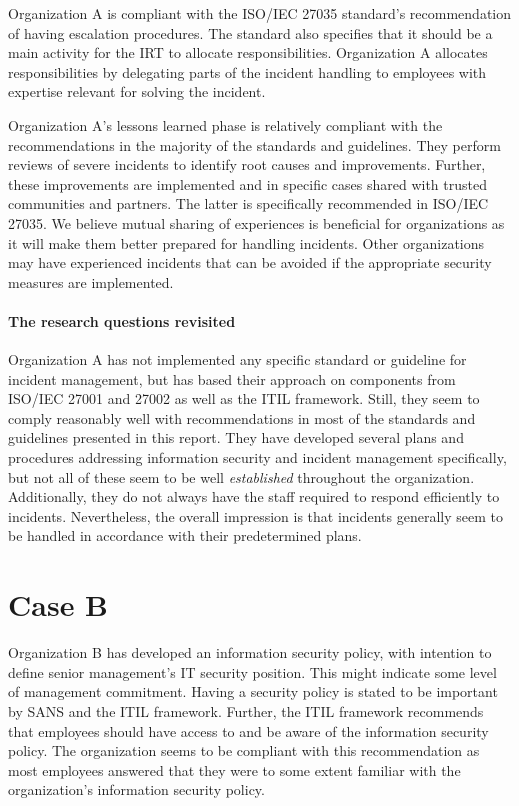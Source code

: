 Organization A is compliant with the ISO/IEC 27035 standard's recommendation of having escalation procedures. The standard also specifies that it should be a main activity for the \ac{IRT} to allocate responsibilities. Organization A allocates responsibilities by delegating parts of the incident handling to employees with expertise relevant for solving the incident.

Organization A's lessons learned phase is relatively compliant with the recommendations in the majority of the standards and guidelines. They perform reviews of severe incidents to identify root causes and improvements. Further, these improvements are implemented and in specific cases shared with trusted communities and partners. The latter is specifically recommended in ISO/IEC 27035. We believe mutual sharing of experiences is beneficial for organizations as it will make them better prepared for handling incidents. Other organizations may have experienced incidents that can be avoided if the appropriate security measures are implemented. 

\paragraph{The research questions revisited}
Organization A has not implemented any specific standard or guideline for incident management, but has based their approach on components from ISO/IEC 27001 and 27002 as well as the \ac{ITIL} framework. Still, they seem to comply reasonably well with recommendations in most of the standards and guidelines presented in this report. They have developed several plans and procedures addressing information security and incident management specifically, but not all of these seem to be well \textit{established} throughout the organization. Additionally, they do not always have the staff required to respond efficiently to incidents. Nevertheless, the overall impression is that incidents generally seem to be handled in accordance with their predetermined plans.

\section{Case B}
\label{sec:discussionCaseB}
Organization B has developed an information security policy, with intention to define senior management's IT security position. This might indicate some level of management commitment. Having a security policy is stated to be important by SANS and the ITIL framework. Further, the ITIL framework recommends that employees should have access to and be aware of the information security policy. The organization seems to be compliant with this recommendation as most employees answered that they were to some extent familiar with the organization's information security policy. 

